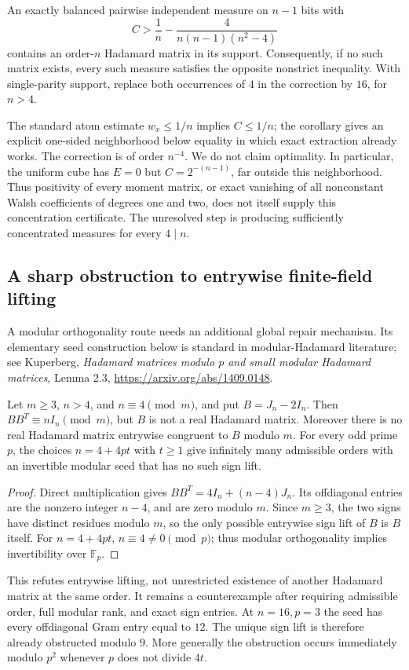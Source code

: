 \begin{corollary}
\label{cor:discrete-gap}
An exactly balanced pairwise independent measure on $n-1$ bits with
\[
 C>\frac1n-\frac4{n(n-1)(n^2-4)}
\]
contains an order-$n$ Hadamard matrix in its support. Consequently,
if no such matrix exists, every such measure satisfies the opposite
nonstrict inequality. With single-parity support, replace both occurrences
of $4$ in the correction by $16$, for $n>4$.
\end{corollary}
The standard atom estimate $w_x\le1/n$ implies $C\le1/n$;
the corollary gives an explicit one-sided neighborhood below equality
in which exact extraction already works. The correction is of order
$n^{-4}$. We do not claim optimality. In particular, the uniform cube
has $E=0$ but $C=2^{-(n-1)}$, far outside this neighborhood.
Thus positivity of every moment matrix, or exact vanishing of all
nonconstant Walsh coefficients of degrees one and two, does not itself
supply this concentration certificate. The unresolved step is producing
sufficiently concentrated measures for every $4\mid n$.

\subsection{A sharp obstruction to entrywise finite-field lifting}
A modular orthogonality route needs an additional global repair mechanism.
Its elementary seed construction below is standard in modular-Hadamard
literature; see Kuperberg, \emph{Hadamard matrices modulo $p$ and small
modular Hadamard matrices}, Lemma 2.3,
\url{https://arxiv.org/abs/1409.0148}.
\begin{proposition}
\label{prop:discrete-modular}
Let $m\ge3$, $n>4$, and $n\equiv4\pmod m$, and put $B=J_n-2I_n$.
Then $BB^T\equiv nI_n\pmod m$, but $B$ is not a real Hadamard matrix.
Moreover there is no real Hadamard matrix entrywise congruent to $B$
modulo $m$. For every odd prime $p$, the choices $n=4+4pt$ with $t\ge1$
give infinitely many admissible orders with an invertible modular seed
that has no such sign lift.
\end{proposition}
\begin{proof}
Direct multiplication gives $BB^T=4I_n+(n-4)J_n$.
Its offdiagonal entries are the nonzero integer $n-4$, and are zero
modulo $m$. Since $m\ge3$, the two signs have distinct residues modulo
$m$, so the only possible entrywise sign lift of $B$ is $B$ itself.
For $n=4+4pt$, $n\equiv4\ne0\pmod p$; thus modular orthogonality
implies invertibility over $\mathbb F_p$.
\end{proof}
This refutes entrywise lifting, not unrestricted existence of another
Hadamard matrix at the same order. It remains a counterexample after
requiring admissible order, full modular rank, and exact sign entries.
At $n=16,p=3$ the seed has every offdiagonal Gram entry equal to $12$.
The unique sign lift is therefore already obstructed modulo $9$.
More generally the obstruction occurs immediately modulo $p^2$ whenever
$p$ does not divide $4t$.

